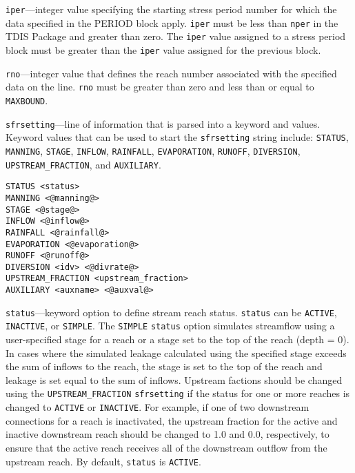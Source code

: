 \item \texttt{iper}---integer value specifying the starting stress period number for which the data specified in the PERIOD block apply.  \texttt{iper} must be less than \texttt{nper} in the TDIS Package and greater than zero.  The \texttt{iper} value assigned to a stress period block must be greater than the \texttt{iper} value assigned for the previous block.

\item \texttt{rno}---integer value that defines the reach number associated with the specified data on the line. \texttt{rno} must be greater than zero and less than or equal to \texttt{MAXBOUND}.

\item \texttt{sfrsetting}---line of information that is parsed into a keyword and values.  Keyword values that can be used to start the \texttt{sfrsetting} string include: \texttt{STATUS}, \texttt{MANNING}, \texttt{STAGE}, \texttt{INFLOW}, \texttt{RAINFALL}, \texttt{EVAPORATION}, \texttt{RUNOFF}, \texttt{DIVERSION}, \texttt{UPSTREAM\_FRACTION}, and \texttt{AUXILIARY}.

\begin{lstlisting}[style=blockdefinition]
STATUS <status>
MANNING <@manning@>
STAGE <@stage@>
INFLOW <@inflow@>
RAINFALL <@rainfall@>
EVAPORATION <@evaporation@>
RUNOFF <@runoff@>
DIVERSION <idv> <@divrate@> 
UPSTREAM_FRACTION <upstream_fraction>
AUXILIARY <auxname> <@auxval@> 
\end{lstlisting}

\item \texttt{status}---keyword option to define stream reach status.  \texttt{status} can be \texttt{ACTIVE}, \texttt{INACTIVE}, or \texttt{SIMPLE}. The \texttt{SIMPLE} \texttt{status} option simulates streamflow using a user-specified stage for a reach or a stage set to the top of the reach (depth = 0). In cases where the simulated leakage calculated using the specified stage exceeds the sum of inflows to the reach, the stage is set to the top of the reach and leakage is set equal to the sum of inflows. Upstream factions should be changed using the \texttt{UPSTREAM\_FRACTION} \texttt{sfrsetting} if the status for one or more reaches is changed to \texttt{ACTIVE} or \texttt{INACTIVE}. For example, if one of two downstream connections for a reach is inactivated, the upstream fraction for the active and inactive downstream reach should be changed to 1.0 and 0.0, respectively, to ensure that the active reach receives all of the downstream outflow from the upstream reach. By default, \texttt{status} is \texttt{ACTIVE}.

